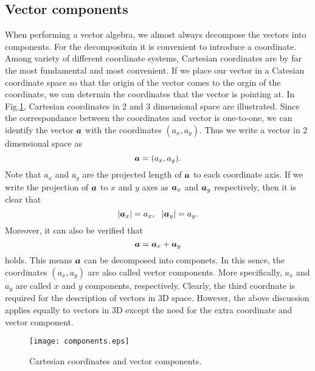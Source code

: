 \documentclass[10pt,a4j]{article}
\begin{document}
\subsection{Vector components}
When performing a vector algebra, we almost always decompose the vectors into components. 
For the decompositoin it is convenient to introduce a coordinate. 
Among variety of different coordinate systems, Cartesian coordinates are 
by far the most fundamental and most convenient.
If we place our vector in a Catesian coordinate space so that the origin of the 
vector comes to the orgin of the coordinate, we can determin the coordinates 
that the vector is pointing at. 
In Fig.\ref{fig:fig1_7}, Cartesian coordinates in 2 and 3 dimensional space 
are illustrated.
Since the correspondance between the coordinates and vector is one-to-one, we can 
identify the vector $\mbox{\boldmath $a$}$ with the coordinates $(a_x,a_y)$. Thus we write a 
vector in 2 dimensional space as
\[
	\mbox{\boldmath $a$}=(a_x, a_y).
\]
Note that $a_x$ and $a_y$ are the projected length of $\mbox{\boldmath $a$}$ to each coordinate axis.
If we write the projection of $\mbox{\boldmath $a$}$ to $x$ and $y$ axes as $\mbox{\boldmath $a$}_x$ and $\mbox{\boldmath $a$}_y$ respectively, 
then it is clear that 
\begin{equation}
	|\mbox{\boldmath $a$}_x|=a_x, \ \ |\mbox{\boldmath $a$}_y|=a_y.
	\label{eqn:}
\end{equation}
Moreover, it can also be verified that 
\begin{equation}
	\mbox{\boldmath $a$}=\mbox{\boldmath $a$}_x+\mbox{\boldmath $a$}_y
	\label{eqn:}
\end{equation}
holds.  This means $\mbox{\boldmath $a$}$ can be decomposed into componets. 
In this sence, the coordinates $(a_x,a_y)$ are also called vector components. 
More specifically, $a_x$ and $a_y$ are called $x$ and $y$ components, respectively.
Clearly, the third coordnate is required for the description of vectors in 3D space. 
However, the above discussion applies equally to vectors in 3D except the need for 
 the extra coordinate and vector component.
\begin{figure}[h]
	\begin{center}
	\texttt{[image: components.eps]} 
	\end{center}
	\caption{Cartesian coordinates and vector components.} 
	\label{fig:fig1_7}
\end{figure}
\end{document}
